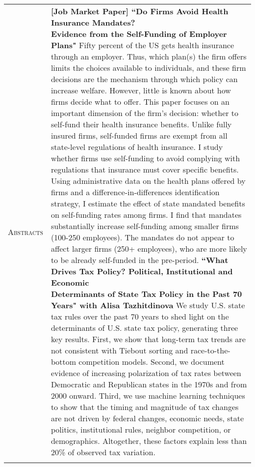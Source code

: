\documentclass[11pt]{article}
\begin{document}
\begin{tabularx}{\textwidth}{@{}Y Z@{}}
	\textsc{Abstracts}  & 
	\textbf{[Job Market Paper] ``Do Firms Avoid Health Insurance Mandates? \newline Evidence from the Self-Funding of Employer Plans"} 
	\vspace{5pt} \newline
	Fifty percent of the US gets health insurance through an employer. Thus, which plan(s) the firm offers limits the choices available to individuals, and these firm decisions are the mechanism through which policy can increase welfare. However, little is known about how firms decide what to offer. This paper focuses on an important dimension of the firm's decision: whether to self-fund their health insurance benefits. Unlike fully insured firms, self-funded firms are exempt from all state-level regulations of health insurance. I study whether firms use self-funding to avoid complying with regulations that insurance must cover specific benefits. Using administrative data on the health plans offered by firms and a difference-in-differences identification strategy, I estimate the effect of state mandated benefits on self-funding rates among firms. I find that mandates substantially increase self-funding among smaller firms (100-250 employees). The mandates do not appear to affect larger firms (250+ employees), who are more likely to be already self-funded in the pre-period.
	\vspace{20pt} \newline
	\textbf{``What Drives Tax Policy? Political, Institutional and Economic \newline Determinants of State Tax Policy in the Past 70 Years" with Alisa Tazhitdinova} 
	\vspace{-8pt} \newline 
	We study U.S. state tax rules over the past 70 years to shed light on the determinants of U.S. state tax policy, generating three key results. First, we show that long-term tax trends are not consistent with Tiebout sorting and race-to-the-bottom competition models. Second, we document evidence of increasing polarization of tax rates between Democratic and Republican states in the 1970s and from 2000 onward. Third, we use machine learning techniques to show that the timing and magnitude of tax changes are not driven by federal changes, economic needs, state politics, institutional rules, neighbor competition, or demographics. Altogether, these factors explain less than 20\% of observed tax variation.
	\\
	\newpage
	

\end{tabularx}
\end{document}
